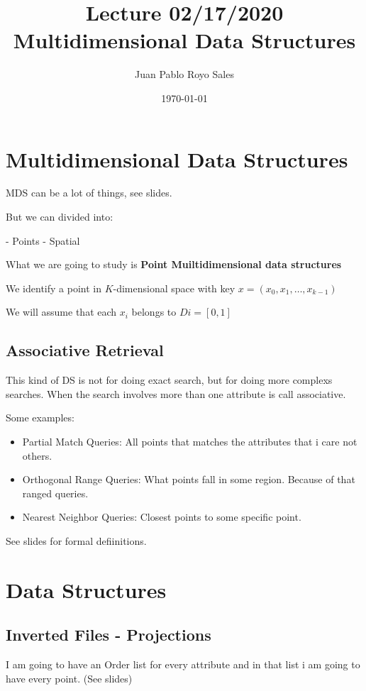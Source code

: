 \documentclass[12pt, a4paper]{article}
\title{Lecture 02/17/2020 \\
Multidimensional Data Structures
}
\author{Juan Pablo Royo Sales}
\date\today
\begin{document}
\maketitle

\section{Multidimensional Data Structures}

MDS can be a lot of things, see slides.

But we can divided into:

- Points
- Spatial

What we are going to study is \textbf{Point Muiltidimensional data structures}

We identify a point in $K$-dimensional space with key $x = (x_0,x_1,\dots,x_{k-1})$

We will assume that each $x_i$ belongs to $Di = [0,1]$

\subsection{Associative Retrieval}
This kind of DS is not for doing exact search, but for doing more complexs searches.
When the search involves more than one attribute is call associative.

Some examples:

\begin{itemize}
  \item Partial Match Queries: All points that matches the attributes that i care not others.
  \item Orthogonal Range Queries: What points fall in some region. Because of that ranged queries.
  \item Nearest Neighbor Queries: Closest points to some specific point.

\end{itemize}


See slides for formal defiinitions.

\section{Data Structures}

\subsection{Inverted Files - Projections}
I am going to have an Order list for every attribute and in that list i am going to have every point. (See slides)
\end{document}
